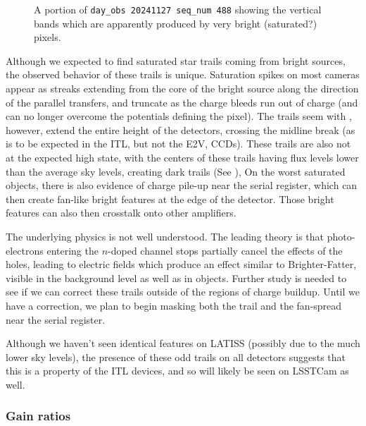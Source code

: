 \begin{figure}
  \begin{center}
    \caption{
      A portion of \texttt{day\_obs 20241127 seq\_num 488} showing the vertical bands which are apparently
        produced by very bright (saturated?) pixels.
    }
\label{fig:darkStreaks}
  \end{center}
\end{figure}

Although we expected to find saturated star trails coming from bright sources, the observed behavior of these trails is unique.
Saturation spikes on most cameras appear as streaks extending from the core of the bright source along the
direction of the parallel transfers, and truncate as the charge bleeds run out of charge (and can no longer
overcome the potentials defining the pixel).
The trails seem with \ComCam, however, extend the entire height of the detectors, crossing the midline break
(as is to be expected in the ITL, but not the E2V, CCDs).
These trails are also not at the expected high state, with the centers of these trails having flux levels
lower than the average sky levels, creating dark trails (See ),
On the worst saturated objects, there is also evidence of charge pile-up near the serial register, which can then create fan-like bright features at the edge of the detector.
Those bright features can also then crosstalk onto other amplifiers.

The underlying physics is not well understood. The leading theory is that photo-electrons entering the
$n$-doped channel stops partially cancel the effects of the holes, leading to electric fields which
produce an effect similar to Brighter-Fatter, visible in the background level as well as in objects.
Further study is needed to see if we can correct these trails outside of the regions of charge buildup.
Until we have a correction, we plan to begin masking both the trail and the fan-spread near the serial register.

Although we haven't seen identical features on LATISS (possibly due to the much lower sky levels), the presence of these odd trails on all \ComCam detectors suggests that this is a property of the ITL devices, and so will likely be seen on LSSTCam as well.

\subsubsection{Gain ratios}

